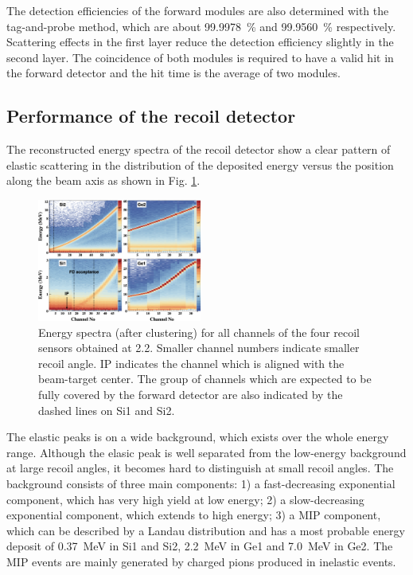 \documentclass[number,5p]{elsarticle}
\begin{document}
The detection efficiencies of the forward modules are also determined with the
tag-and-probe method, which are about \SI{99.9978}{\percent} and \SI{99.9560}{\percent} respectively.
Scattering effects in the first layer reduce the detection efficiency slightly in the second layer.
The coincidence of both modules is required to have a valid hit in the
forward detector and the hit time is the average of two modules.

\subsection{Performance of the recoil detector}
\label{sec:recoil_performance}
The reconstructed energy spectra of the recoil detector show a clear pattern
of elastic scattering in the distribution of the deposited energy versus the
position along the beam axis as shown in Fig. \ref{fig:e_map}.
\begin{figure}[tb!]
  \centering
  \includegraphics[width=0.48\textwidth]{./e_map.png}
  \caption{Energy spectra (after clustering) for all channels of the four recoil sensors obtained at \SI{2.2}{\momentum}.
    Smaller channel numbers indicate smaller recoil angle.
    IP indicates the channel which is aligned with
    the beam-target center.
    The group of channels which are expected to be fully covered by the forward detector are
    also indicated by the dashed lines on Si1 and Si2.
  }
  \label{fig:e_map}
\end{figure}
The elastic peaks is on a wide background, which exists over the whole energy range.
Although the elasic peak is well separated from the low-energy background at
large recoil angles, it becomes hard to distinguish at small recoil angles.
The background consists of three main components:
1) a fast-decreasing exponential component, which has very high yield at low energy;
2) a slow-decreasing exponential component, which extends to high energy;
3) a MIP component, which can be described by a Landau distribution and has a most probable energy deposit of \SI{0.37}{\MeV} in Si1 and Si2, \SI{2.2}{\MeV} in Ge1 and \SI{7.0}{\MeV} in Ge2.
The MIP events are mainly generated by charged pions produced in inelastic events.
\end{document}

